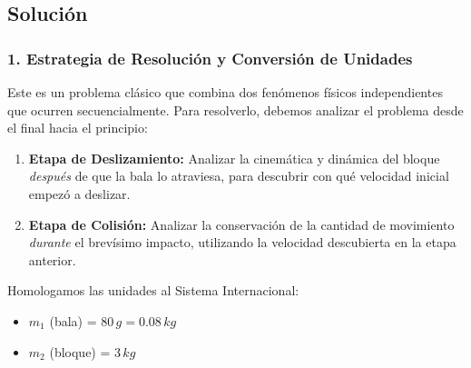 \documentclass[12pt, a4paper]{article}
\begin{document}
\begin{center}
\end{center}

\subsection*{Solución}

\subsubsection*{1. Estrategia de Resolución y Conversión de Unidades}
Este es un problema clásico que combina dos fenómenos físicos independientes que ocurren secuencialmente. Para resolverlo, debemos analizar el problema desde el final hacia el principio:
\begin{enumerate}
    \item \textbf{Etapa de Deslizamiento:} Analizar la cinemática y dinámica del bloque \textit{después} de que la bala lo atraviesa, para descubrir con qué velocidad inicial empezó a deslizar.
    \item \textbf{Etapa de Colisión:} Analizar la conservación de la cantidad de movimiento \textit{durante} el brevísimo impacto, utilizando la velocidad descubierta en la etapa anterior.
\end{enumerate}

Homologamos las unidades al Sistema Internacional:
\begin{itemize}
    \item $m_1$ (bala) = $80 \, \si{g} = 0.08 \, \si{kg}$
    \item $m_2$ (bloque) = $3 \, \si{kg}$
\end{itemize}
\end{document}
